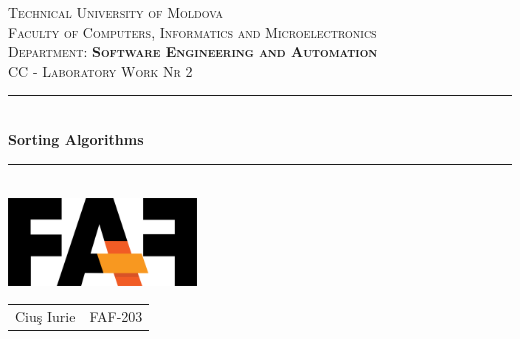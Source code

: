 \documentclass[12pt]{article}
\begin{document}
\newcommand{\HRule}{\rule{\linewidth}{0.2mm}}

\center


\textsc{
    \LARGE Technical University of Moldova
}\\[0cm]

\textsc{
    Faculty of Computers, Informatics and Microelectronics
}\\[0cm]

\textsc{
    Department: \textbf{Software Engineering and Automation}
}\\[4cm]




\textsc{
    \Large CC - Laboratory Work Nr 2
}\\[0cm]




\HRule \\[0.6cm]
{ \huge \bfseries Sorting Algorithms }\\[0.1cm]
\HRule \\[1.5cm]




{\includegraphics[width=5cm]{logo.PNG}}\\[1cm]




\begin{center}
    \begin{tabular}{ c c }
        Ciuş Iurie & FAF-203
    \end{tabular}
\end{center}

\end{document}
